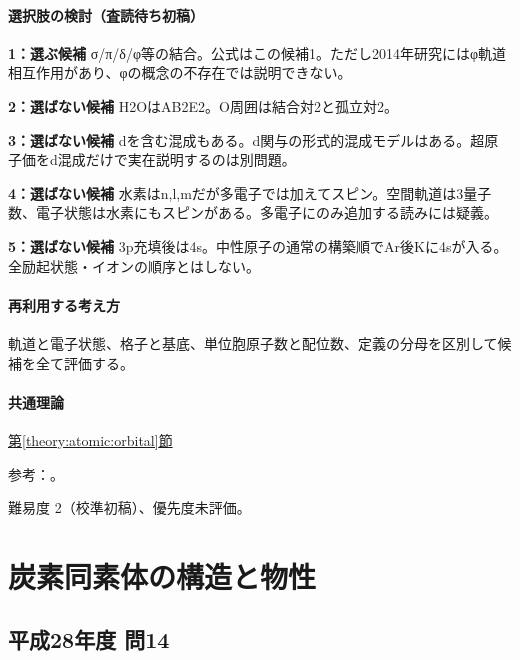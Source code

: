 \paragraph{選択肢の検討（査読待ち初稿）}\mbox{}\par

\noindent\textbf{1：選ぶ候補} σ/π/δ/φ等の結合。公式はこの候補1。ただし2014年研究にはφ軌道相互作用があり、φの概念の不存在では説明できない。\par

\noindent\textbf{2：選ばない候補} H2OはAB2E2。O周囲は結合対2と孤立対2。\par

\noindent\textbf{3：選ばない候補} dを含む混成もある。d関与の形式的混成モデルはある。超原子価をd混成だけで実在説明するのは別問題。\par

\noindent\textbf{4：選ばない候補} 水素はn,l,mだが多電子では加えてスピン。空間軌道は3量子数、電子状態は水素にもスピンがある。多電子にのみ追加する読みには疑義。\par

\noindent\textbf{5：選ばない候補} 3p充填後は4s。中性原子の通常の構築順でAr後Kに4sが入る。全励起状態・イオンの順序とはしない。\par

\paragraph{再利用する考え方} 軌道と電子状態、格子と基底、単位胞原子数と配位数、定義の分母を区別して候補を全て評価する。

\paragraph{共通理論} \hyperref[theory:atomic:orbital]{第\ref*{theory:atomic:orbital}節}

\par 参考：\cite{atomic_quantum,atomic_phi2014}。

\par 難易度 2（校準初稿）、優先度未評価。

\section{炭素同素体の構造と物性}

\subsection{平成28年度 問14}
\label{q:h28-reg-applied-14}

